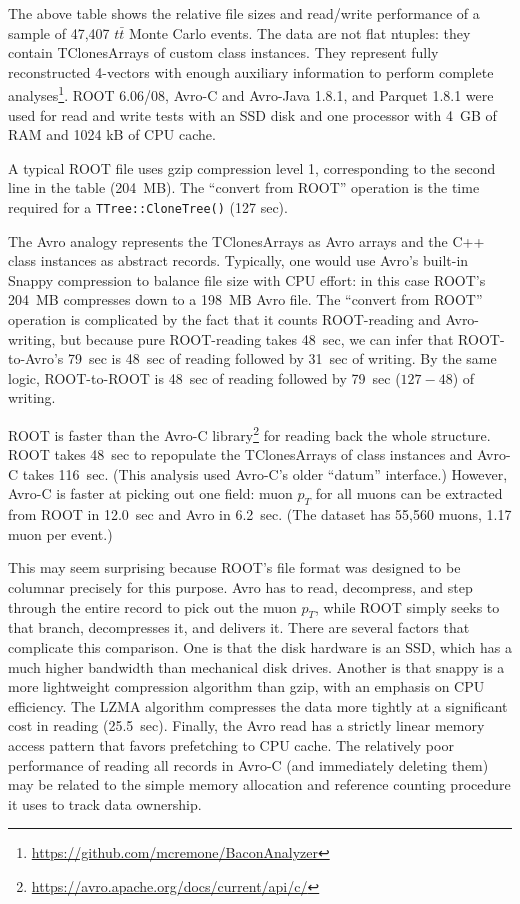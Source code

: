 \documentclass{article}
\begin{document}
\vspace{0.2 cm}
The above table shows the relative file sizes and read/write performance of a sample of 47,407 $t\bar{t}$ Monte Carlo events. The data are not flat ntuples: they contain TClonesArrays of custom class instances. They represent fully reconstructed 4-vectors with enough auxiliary information to perform complete analyses\footnote{\url{https://github.com/mcremone/BaconAnalyzer}}. ROOT 6.06/08, Avro-C and Avro-Java 1.8.1, and Parquet 1.8.1 were used for read and write tests with an SSD disk and one processor with 4~GB of RAM and 1024 kB of CPU cache.

A typical ROOT file uses gzip compression level 1, corresponding to the second line in the table (204~MB). The ``convert from ROOT'' operation is the time required for a {\tt TTree::CloneTree()} (127 sec).

The Avro analogy represents the TClonesArrays as Avro arrays and the C++ class instances as abstract records. Typically, one would use Avro's built-in Snappy compression to balance file size with CPU effort: in this case ROOT's 204~MB compresses down to a 198~MB Avro file. The ``convert from ROOT'' operation is complicated by the fact that it counts ROOT-reading and Avro-writing, but because pure ROOT-reading takes 48~sec, we can infer that ROOT-to-Avro's 79~sec is 48~sec of reading followed by 31~sec of writing. By the same logic, ROOT-to-ROOT is 48~sec of reading followed by 79~sec ($127 - 48$) of writing.

ROOT is faster than the Avro-C library\footnote{\url{https://avro.apache.org/docs/current/api/c/}} for reading back the whole structure. ROOT takes 48~sec to repopulate the TClonesArrays of class instances and Avro-C takes 116~sec. (This analysis used Avro-C's older ``datum'' interface.) However, Avro-C is faster at picking out one field: muon $p_T$ for all muons can be extracted from ROOT in 12.0~sec and Avro in 6.2~sec. (The dataset has 55,560 muons, 1.17 muon per event.)

This may seem surprising because ROOT's file format was designed to be columnar precisely for this purpose. Avro has to read, decompress, and step through the entire record to pick out the muon $p_T$, while ROOT simply seeks to that branch, decompresses it, and delivers it. There are several factors that complicate this comparison. One is that the disk hardware is an SSD, which has a much higher bandwidth than mechanical disk drives. Another is that snappy is a more lightweight compression algorithm than gzip, with an emphasis on CPU efficiency. The LZMA algorithm compresses the data more tightly at a significant cost in reading (25.5~sec). Finally, the Avro read has a strictly linear memory access pattern that favors prefetching to CPU cache. The relatively poor performance of reading all records in Avro-C (and immediately deleting them) may be related to the simple memory allocation and reference counting procedure it uses to track data ownership.
\end{document}
